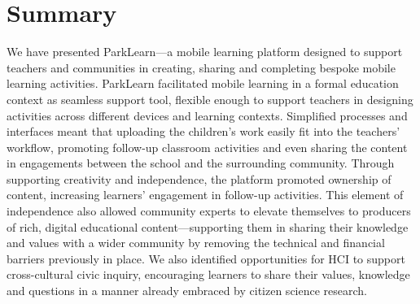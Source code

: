 \section{Summary}
We have presented ParkLearn—a mobile learning platform designed to support
teachers and communities in creating, sharing and completing bespoke mobile
learning activities. ParkLearn facilitated mobile learning in a formal education
context as seamless support tool, flexible enough to support teachers in
designing activities across different devices and learning contexts. Simplified
processes and interfaces meant that uploading the children’s work easily fit
into the teachers’ workflow, promoting follow-up classroom activities and even
sharing the content in engagements between the school and the surrounding
community. Through supporting creativity and independence, the platform promoted
ownership of content, increasing learners’ engagement in follow-up activities.
This element of independence also allowed community experts to elevate
themselves to producers of rich, digital educational content—supporting them in
sharing their knowledge and values with a wider community by removing the
technical and financial barriers previously in place. We also identified
opportunities for HCI to support cross-cultural civic inquiry, encouraging
learners to share their values, knowledge and questions in a manner already
embraced by citizen science research.